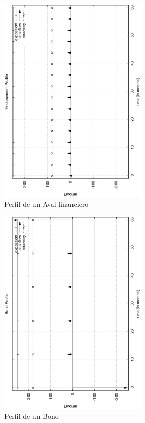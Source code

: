 \begin{figure}[!hb]
\begin{center}
\includegraphics[height=10cm, angle=-90]{./images/endorsement.ps}
\caption{Perfil de un Aval financiero}
\label{endorsement}
\end{center}
\end{figure}

\begin{figure}[!hb]
\begin{center}
\includegraphics[height=10cm, angle=-90]{./images/bond.ps}
\caption{Perfil de un Bono}
\label{bond}
\end{center}
\end{figure}

